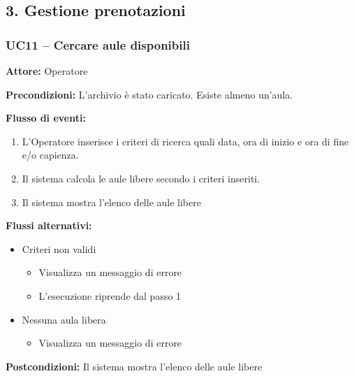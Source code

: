 \documentclass[a4paper,11pt]{article}
\begin{document}
\subsection*{3. Gestione prenotazioni}
\begin{samepage}
\subsubsection*{UC11 -- Cercare aule disponibili}
\begin{ucbox}

\noindent\textbf{Attore:} Operatore\par
\noindent\textbf{Precondizioni:} L'archivio è stato caricato. Esiste almeno un'aula.\par

\noindent\textbf{Flusso di eventi:}
\begin{enumerate}
\item L'Operatore inserisce i criteri di ricerca quali data, ora di inizio e ora di fine e/o capienza. \item Il sistema calcola le aule libere secondo i criteri inseriti. \item Il sistema mostra l'elenco delle aule libere \end{enumerate}
\noindent\textbf{Flussi alternativi:}
\begin{itemize}
\item[1a.] Criteri non validi
\begin{itemize}
\item Visualizza un messaggio di errore
\item L'esecuzione riprende dal passo 1
\end{itemize}
\item[3a.] Nessuna aula libera
\begin{itemize}
\item Visualizza un messaggio di errore
\end{itemize}
\end{itemize}
\noindent\textbf{Postcondizioni:} Il sistema mostra l'elenco delle aule libere\par
\end{ucbox}
\end{samepage}
\end{document}
